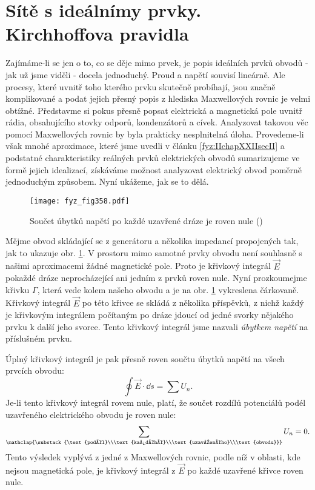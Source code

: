 \section{Sítě s ideálnímy prvky. Kirchhoffova pravidla}\label{fyz:IIchapXXIIsecIII}
  Zajímáme-li se jen o to, co se děje mimo prvek, je popis ideálních prvků obvodů - jak už jsme 
  viděli - docela jednoduchý. Proud a napětí souvisí lineárně. Ale procesy, které uvnitř toho 
  kterého prvku skutečně probíhají, jsou značně komplikované a podat jejich přesný popis z hlediska 
  Maxwellových rovnic je velmi obtížné. Představme si pokus přesně popsat elektrická a magnetická 
  pole uvnitř rádia, obsahujícího stovky odporů, kondenzátorů a cívek. Analyzovat takovou věc 
  pomocí Maxwellových rovnic by byla prakticky nesplnitelná úloha. Provedeme-li však mnohé 
  aproximace, které jsme uvedli v článku \ref{fyz:IIchapXXIIsecII} a podstatné charakteristiky 
  reálných prvků elektrických obvodů sumarizujeme ve formě jejich idealizací, získáváme možnost 
  analyzovat elektrický obvod poměrně jednoduchým způsobem. Nyní ukážeme, jak se to dělá.
  
  \begin{figure}[ht!] %
    \centering
    \texttt{[image: fyz\_fig358.pdf]}
    \caption{Součet úbytků napětí po každé uzavřené dráze je roven nule
             (\cite[s.~399]{Feynman02})}
    \label{fyz:fig358}
  \end{figure}
  
  Mějme obvod skládající se z generátoru a několika impedancí propojených tak, jak to ukazuje obr. 
  \ref{fyz:fig358}. V prostoru mimo samotné prvky obvodu není souhlasně s našimi aproximacemi žádné 
  magnetické pole. Proto je křivkový integrál \(\vec{E}\) pokaždé dráze neprocházející ani jedním z 
  prvků roven nule. Nyní prozkoumejme křivku \(\Gamma\), která vede kolem našeho obvodu a je na 
  obr. \ref{fyz:fig358} vykreslena čárkovaně. Křivkový integrál \(\vec{E}\) po této křivce se 
  skládá z několika příspěvků, z nichž každý je křivkovým integrálem počítaným po dráze jdoucí od 
  jedné svorky nějakého prvku k další jeho svorce. Tento křivkový integrál jsme nazvali 
  \emph{úbytkem napětí} na příslušném prvku.
  
  Úplný křivkový integrál je pak přesně roven součtu úbytků napětí na všech prvcích obvodu: 
  \begin{equation}\label{fyz:eq482}
    \oint\vec{E}\cdot\dd{s} = \sum U_n.
  \end{equation}
  Je-li tento křivkový integrál rovem nule, platí, že součet rozdílů potenciálů podél uzavřeného 
  elektrického obvodu je roven nule:
  \begin{equation}\label{fyz:eq483}
    \sum_{\mathclap{\substack{\text{podél}\\\text{každéhé}\\\text{uzavřeného}\\\text{obvodu}}}} 
         U_n = 0.
  \end{equation}
  Tento výsledek vyplývá z jedné z Maxwellových rovnic, podle níž v oblasti, kde nejsou magnetická 
  pole, je křivkový integrál z \(\vec{E}\) po každé uzavřené křivce roven nule. 
  
